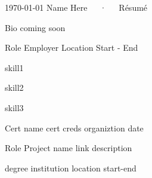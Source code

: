 \documentclass[11pt, letterpaper]{awesome-cv}
\begin{document}
\makecvheader[C]

\makecvfooter
  {\today}
  {Name Here~~~·~~~Résumé}
  {\thepage}

\begin{cvparagraph}

Bio coming soon

\end{cvparagraph}

\begin{cventries}


  \cventry
    {Role}
    {Employer}
    {Location}
    {Start - End}
    {
      \begin{cvitems}
        \item{skill1}
        \item{skill2}
        \item{skill3}
      \end{cvitems}
    }

\end{cventries}

\begin{cvhonors}

  \cvhonor
    {Cert name}
    {cert creds}
    {organiztion}
    {date}
\end{cvhonors}

\begin{cventries}

  \cventry
    {Role}
    {Project name}
    {link}
    {}
    {description}

\end{cventries}

\begin{cventries}

  \cventry
    {degree}
    {institution}
    {location}
    {start-end}
    {
    }


\end{cventries}

\end{document}
